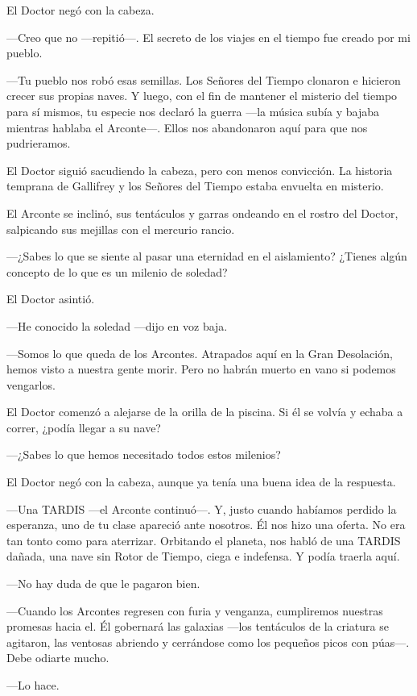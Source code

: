 El Doctor negó con la cabeza. 

---Creo que no ---repitió---. El secreto de los viajes en el tiempo fue
creado por mi pueblo.

---Tu pueblo nos robó esas semillas. Los Señores del Tiempo clonaron e
hicieron crecer sus propias naves. Y luego, con el fin de mantener el
misterio del tiempo para sí mismos, tu especie nos declaró la
guerra ---la música subía y bajaba mientras hablaba el Arconte---. Ellos
nos abandonaron aquí para que nos pudrieramos.

El Doctor siguió sacudiendo la cabeza, pero con menos convicción. La
historia temprana de Gallifrey y los Señores del Tiempo estaba envuelta
en misterio.

El Arconte se inclinó, sus tentáculos y garras ondeando en el rostro del
Doctor, salpicando sus mejillas con el mercurio rancio. 

---¿Sabes lo que se siente al pasar una eternidad en el aislamiento?
¿Tienes algún concepto de lo que es un milenio de soledad?

El Doctor asintió. 

---He conocido la soledad ---dijo en voz baja.

---Somos lo que queda de los Arcontes. Atrapados aquí en la Gran
Desolación, hemos visto a nuestra gente morir. Pero no habrán muerto en
vano si podemos vengarlos.

El Doctor comenzó a alejarse de la orilla de la piscina. Si él se volvía
y echaba a correr, ¿podía llegar a su nave?

---¿Sabes lo que hemos necesitado todos estos milenios?

El Doctor negó con la cabeza, aunque ya tenía una buena idea de la
respuesta.

---Una TARDIS ---el Arconte continuó---. Y, justo cuando habíamos
perdido la esperanza, uno de tu clase apareció ante nosotros. Él nos
hizo una oferta. No era tan tonto como para aterrizar. Orbitando el
planeta, nos habló de una TARDIS dañada, una nave sin Rotor de Tiempo,
ciega e indefensa. Y podía traerla aquí.

---No hay duda de que le pagaron bien.

---Cuando los Arcontes regresen con furia y venganza, cumpliremos
nuestras promesas hacia el. Él gobernará las galaxias ---los tentáculos
de la criatura se agitaron, las ventosas abriendo y cerrándose como los
pequeños picos con púas---. Debe odiarte mucho.

---Lo hace.


